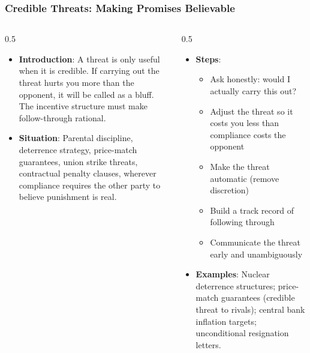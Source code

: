 \begin{frame}[fragile]\frametitle{Credible Threats: Making Promises Believable}
\begin{columns}
    \begin{column}[T]{0.5\linewidth}
      \begin{itemize}
        \item \textbf{Introduction}: A threat is only useful when it is credible. If carrying out the threat hurts you more than the opponent, it will be called as a bluff. The incentive structure must make follow-through rational.
        \item \textbf{Situation}: Parental discipline, deterrence strategy, price-match guarantees, union strike threats, contractual penalty clauses, wherever compliance requires the other party to believe punishment is real.
      \end{itemize}
    \end{column}
    \begin{column}[T]{0.5\linewidth}
      \begin{itemize}
        \item \textbf{Steps}:
        \begin{itemize}
          \item Ask honestly: would I actually carry this out?
          \item Adjust the threat so it costs you less than compliance costs the opponent
          \item Make the threat automatic (remove discretion)
          \item Build a track record of following through
          \item Communicate the threat early and unambiguously
        \end{itemize}\item \textbf{Examples}: Nuclear deterrence structures; price-match guarantees (credible threat to rivals); central bank inflation targets; unconditional resignation letters.
      \end{itemize}
    \end{column}
  \end{columns}
\end{frame}

